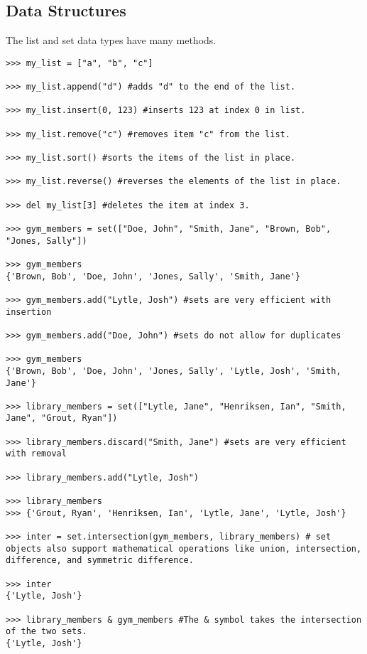 \subsection*{Data Structures}
\begin{example}
The list and set data types have many methods. 
\begin{lstlisting}
>>> my_list = ["a", "b", "c"]

>>> my_list.append("d") #adds "d" to the end of the list.

>>> my_list.insert(0, 123) #inserts 123 at index 0 in list.

>>> my_list.remove("c") #removes item "c" from the list.

>>> my_list.sort() #sorts the items of the list in place.

>>> my_list.reverse() #reverses the elements of the list in place. 

>>> del my_list[3] #deletes the item at index 3.

>>> gym_members = set(["Doe, John", "Smith, Jane", "Brown, Bob", "Jones, Sally"])

>>> gym_members
{'Brown, Bob', 'Doe, John', 'Jones, Sally', 'Smith, Jane'}

>>> gym_members.add("Lytle, Josh") #sets are very efficient with insertion

>>> gym_members.add("Doe, John") #sets do not allow for duplicates

>>> gym_members
{'Brown, Bob', 'Doe, John', 'Jones, Sally', 'Lytle, Josh', 'Smith, Jane'}

>>> library_members = set(["Lytle, Jane", "Henriksen, Ian", "Smith, Jane", "Grout, Ryan"])

>>> library_members.discard("Smith, Jane") #sets are very efficient with removal

>>> library_members.add("Lytle, Josh") 

>>> library_members
>>> {'Grout, Ryan', 'Henriksen, Ian', 'Lytle, Jane', 'Lytle, Josh'}

>>> inter = set.intersection(gym_members, library_members) # set objects also support mathematical operations like union, intersection, difference, and symmetric difference.

>>> inter
{'Lytle, Josh'}

>>> library_members & gym_members #The & symbol takes the intersection of the two sets.
{'Lytle, Josh'}



\end{lstlisting}

\end{example}



